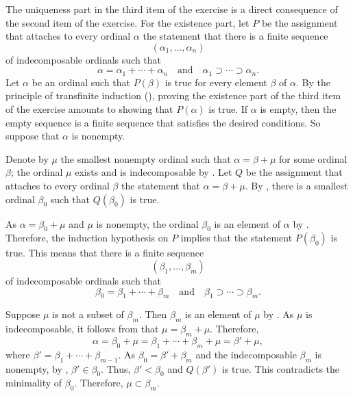 \documentclass{article}
\begin{document}
\begin{solution}
  The uniqueness part in the third item of the exercise is a direct
  consequence of the second item of the exercise.  For the existence
  part, let \(P\) be the assignment that attaches to every ordinal
  \(\alpha\) the statement that there is a finite sequence
  \begin{displaymath}
    (\alpha_1, \dotsc, \alpha_n)
  \end{displaymath}
  of indecomposable ordinals such that
  \begin{displaymath}
    \alpha = \alpha_1 + \dotsb + \alpha_n
    \quad \text{and} \quad
    \alpha_1 \supset \dotsb \supset \alpha_n.
  \end{displaymath}
  Let \(\alpha\) be an ordinal such that \(P(\beta)\) is true for
  every element \(\beta\) of \(\alpha\).  By the principle of
  transfinite induction (), proving the existence
  part of the third item of the exercise amounts to showing that
  \(P(\alpha)\) is true.  If \(\alpha\) is empty, then the empty
  sequence is a finite sequence that satisfies the desired conditions.
  So suppose that \(\alpha\) is nonempty.

  Denote by \(\mu\) the smallest nonempty ordinal such that
  \(\alpha = \beta + \mu\) for some ordinal \(\beta\); the ordinal
  \(\mu\) exists and is indecomposable by .  Let
  \(Q\) be the assignment that attaches to every ordinal \(\beta\) the
  statement that \(\alpha = \beta + \mu\).  By ,
  there is a smallest ordinal \(\beta_0\) such that \(Q(\beta_0)\) is
  true.

  As \(\alpha = \beta_0 + \mu\) and \(\mu\) is nonempty, the ordinal
  \(\beta_0\) is an element of \(\alpha\) by .
  Therefore, the induction hypothesis on \(P\) implies that the
  statement \(P(\beta_0)\) is true.  This means that there is a finite
  sequence
  \begin{displaymath}
    (\beta_1, \dotsc, \beta_m)
  \end{displaymath}
  of indecomposable ordinals such that
  \begin{displaymath}
    \beta_0 = \beta_1 + \dotsb + \beta_m
    \quad \text{and} \quad
    \beta_1 \supset \dotsb \supset \beta_m.
  \end{displaymath}

  Suppose \(\mu\) is not a subset of \(\beta_m\).  Then \(\beta_m\) is
  an element of \(\mu\) by .  As
  \(\mu\) is indecomposable, it follows from  that
  \(\mu = \beta_m + \mu\).  Therefore,
  \begin{displaymath}
    \alpha = \beta_0 + \mu = \beta_1 + \dotsb + \beta_m + \mu =
    \beta' + \mu,
  \end{displaymath}
  where \(\beta' = \beta_1 + \dotsb + \beta_{m-1}\).  As
  \(\beta_0 = \beta' + \beta_m\) and the indecomposable \(\beta_m\) is
  nonempty, by , \(\beta' \in \beta_0\).  Thus,
  \(\beta' < \beta_0\) and \(Q(\beta')\) is true.  This contradicts
  the minimality of \(\beta_0\).  Therefore, \(\mu \subset \beta_m\).


\end{solution}
\end{document}
